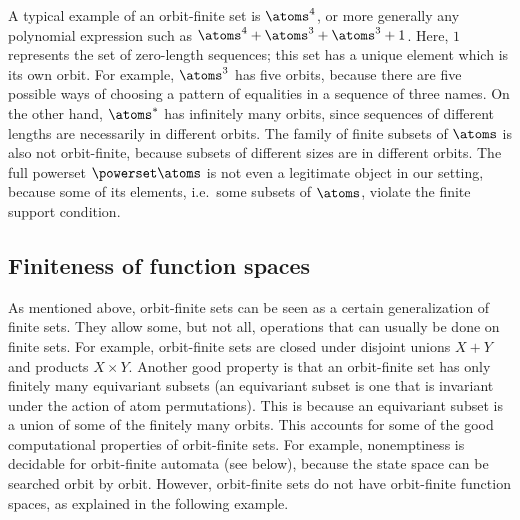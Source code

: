 A typical example of an orbit-finite set is $\atoms^4$, or more generally any polynomial expression such as $\atoms^4 + \atoms^3 + \atoms^3 + 1$. Here, $1$ represents the set of zero-length sequences; this set has a unique element which is its own orbit.  For  example,  $\atoms^3$ has five orbits, because there are five possible ways of choosing a pattern of equalities in a sequence of three names. On the other hand,  $\atoms^*$ has infinitely many orbits, since sequences of different lengths are necessarily in different orbits.   The family of finite subsets of $\atoms$  is also  not orbit-finite, because subsets of different sizes are in different orbits. The full powerset $\powerset \atoms$ is not even a legitimate object in our setting, because some of its elements, i.e.~some subsets of $\atoms$, violate the finite support condition.

        

\subsection{Finiteness of function spaces}
\label{sec:orbit-finite-function-spaces}
As mentioned above, orbit-finite sets can be seen as  a certain generalization of finite sets. They allow some, but not all, operations that can usually be done on finite sets. For example, orbit-finite sets are closed under disjoint unions $X + Y$ and products $X \times Y$.  Another good property is that an orbit-finite set has only finitely many equivariant subsets (an equivariant subset is one that is invariant under the action of atom permutations). This is because an equivariant subset is a union of some of the finitely many orbits. This accounts for some of the good computational properties of orbit-finite sets. For example, nonemptiness is decidable for orbit-finite automata (see below), because the state space can be searched orbit by orbit.
However, orbit-finite sets do not have orbit-finite function spaces, as explained in the following example. 

